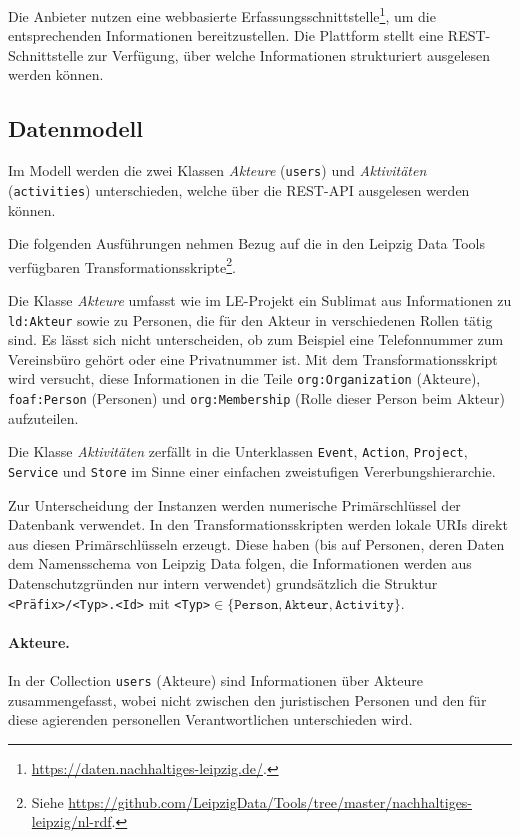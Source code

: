 \documentclass[a4paper,11pt]{article}
\begin{document}
Die Anbieter nutzen eine webbasierte
Erfassungsschnittstelle\footnote{\url{https://daten.nachhaltiges-leipzig.de/}.},
um die entsprechenden Informationen bereitzustellen.  Die Plattform stellt
eine REST-Schnittstelle zur Verfügung, über welche Informationen strukturiert
ausgelesen werden können.

\subsection{Datenmodell}

Im Modell werden die zwei Klassen \emph{Akteure} (\texttt{users}) und
\emph{Aktivitäten} (\texttt{activities}) unterschieden, welche über die
REST-API ausgelesen werden können.

Die folgenden Ausführungen nehmen Bezug auf die in den Leipzig
Data Tools verfügbaren Transformationsskripte\footnote{Siehe
  \url{https://github.com/LeipzigData/Tools/tree/master/nachhaltiges-leipzig/nl-rdf}.}.

Die Klasse \emph{Akteure} umfasst wie im LE-Projekt ein Sublimat aus
Informationen zu \texttt{ld:Akteur} sowie zu Personen, die für den Akteur in
verschiedenen Rollen tätig sind.  Es lässt sich nicht unterscheiden, ob zum
Beispiel eine Telefonnummer zum Vereinsbüro gehört oder eine Privatnummer ist.
Mit dem Transformationsskript wird versucht, diese Informationen in die Teile
\texttt{org:Organization} (Akteure), \texttt{foaf:Person} (Personen) und
\texttt{org:Membership} (Rolle dieser Person beim Akteur) aufzuteilen. 

Die Klasse \emph{Aktivitäten} zerfällt in die Unterklassen \texttt{Event},
\texttt{Action}, \texttt{Project}, \texttt{Service} und \texttt{Store} im
Sinne einer einfachen zweistufigen Vererbungshierarchie.

Zur Unterscheidung der Instanzen werden numerische Primärschlüssel der
Datenbank verwendet. In den Transformationsskripten werden lokale URIs direkt
aus diesen Primärschlüsseln erzeugt. Diese haben (bis auf Personen, deren
Daten dem Namensschema von Leipzig Data folgen, die Informationen werden aus
Datenschutzgründen nur intern verwendet) grundsätzlich die Struktur
\texttt{<Präfix>/<Typ>.<Id>} mit \texttt{<Typ>}$\in \{\texttt{Person},
\texttt{Akteur}, \texttt{Activity}\}$.

\paragraph{Akteure.}
In der Collection \texttt{users} (Akteure) sind Informationen über Akteure
zusammengefasst, wobei nicht zwischen den juristischen Personen und den für
diese agierenden personellen Verantwortlichen unterschieden wird. 
\end{document}
